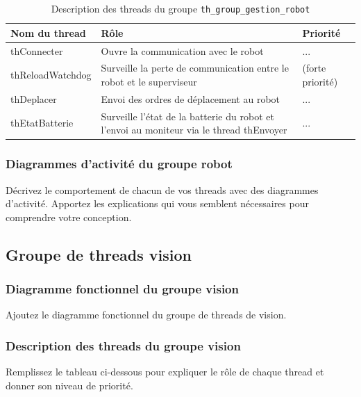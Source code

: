 \documentclass[11pt, a4paper]{paper}
\begin{document}
\begin{table}[htp]
\caption{Description des threads du groupe {\tt th\_group\_gestion\_robot}}
\begin{center}
\begin{tabular}{|p{3cm}|p{8.5cm}|p{2cm}|}
\hline
\bf Nom du thread &	\bf Rôle &	\bf Priorité \\
\hline
\hline
\color{black}thConnecter &	\color{black}Ouvre la communication avec le robot &	\color{black}...\\
\hline
\color{black}thReloadWatchdog &	\color{black}Surveille la perte de communication entre le robot et le superviseur &	\color{black}(forte priorité)\\
\hline
\color{black}thDeplacer &	\color{black}Envoi des ordres de déplacement au robot &	\color{black}...\\
\hline
\color{black}thEtatBatterie &	\color{black}Surveille l'état de la batterie du robot et l'envoi au moniteur via le thread thEnvoyer &	\color{black}...\\
\hline
\end{tabular}
\end{center}
\label{tab:gt_moniteur}
\end{table}%
\FloatBarrier

\subsubsection{Diagrammes d'activité du groupe robot}
{\color{blue}Décrivez le comportement de chacun de vos threads avec des diagrammes d'activité. Apportez les explications qui vous semblent nécessaires pour comprendre votre conception.}

\subsection{Groupe de threads vision}

\subsubsection{Diagramme fonctionnel du groupe vision}

{\color{blue} Ajoutez le diagramme fonctionnel du groupe de threads de vision.}

\subsubsection{Description des threads du groupe vision}
{\color{red} Remplissez le tableau ci-dessous pour expliquer le rôle de chaque thread et donner son niveau de priorité.}
\end{document}
